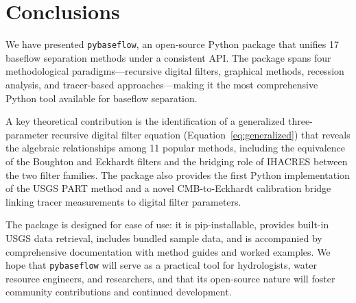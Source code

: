 \documentclass[hydrology,article,submit,pdftex,moreauthors]{Definitions/mdpi}
\begin{document}
\section{Conclusions}
\label{sec:conclusions}

We have presented \texttt{pybaseflow}, an open-source Python package that unifies 17 baseflow separation methods under a consistent API. The package spans four methodological paradigms---recursive digital filters, graphical methods, recession analysis, and tracer-based approaches---making it the most comprehensive Python tool available for baseflow separation.

A key theoretical contribution is the identification of a generalized three-parameter recursive digital filter equation (Equation~\ref{eq:generalized}) that reveals the algebraic relationships among 11 popular methods, including the equivalence of the Boughton and Eckhardt filters and the bridging role of IHACRES between the two filter families. The package also provides the first Python implementation of the USGS PART method and a novel CMB-to-Eckhardt calibration bridge linking tracer measurements to digital filter parameters.

The package is designed for ease of use: it is pip-installable, provides built-in USGS data retrieval, includes bundled sample data, and is accompanied by comprehensive documentation with method guides and worked examples. We hope that \texttt{pybaseflow} will serve as a practical tool for hydrologists, water resource engineers, and researchers, and that its open-source nature will foster community contributions and continued development.

\vspace{6pt}



\end{document}
